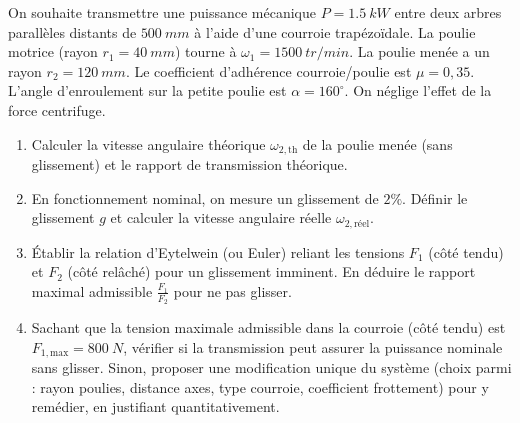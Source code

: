 \documentclass[11pt]{article}
\begin{document}
\begin{exercice}
On souhaite transmettre une puissance mécanique $P = \SI{1.5}{kW}$ entre deux arbres parallèles distants de $\SI{500}{mm}$ à l'aide d'une courroie trapézoïdale. La poulie motrice (rayon $r_1 = \SI{40}{mm}$) tourne à $\omega_1 = \SI{1500}{tr/min}$. La poulie menée a un rayon $r_2 = \SI{120}{mm}$. Le coefficient d'adhérence courroie/poulie est $\mu = 0,35$. L'angle d'enroulement sur la petite poulie est $\alpha = 160^\circ$. On néglige l'effet de la force centrifuge.

\begin{enumerate}
    \item Calculer la vitesse angulaire théorique $\omega_{2,\text{th}}$ de la poulie menée (sans glissement) et le rapport de transmission théorique.
    \item En fonctionnement nominal, on mesure un glissement de $2\%$. Définir le glissement $g$ et calculer la vitesse angulaire réelle $\omega_{2,\text{réel}}$.
    \item Établir la relation d'Eytelwein (ou Euler) reliant les tensions $F_1$ (côté tendu) et $F_2$ (côté relâché) pour un glissement imminent. En déduire le rapport maximal admissible $\frac{F_1}{F_2}$ pour ne pas glisser.
    \item Sachant que la tension maximale admissible dans la courroie (côté tendu) est $F_{1,\text{max}} = \SI{800}{N}$, vérifier si la transmission peut assurer la puissance nominale sans glisser. Sinon, proposer une modification unique du système (choix parmi : rayon poulies, distance axes, type courroie, coefficient frottement) pour y remédier, en justifiant quantitativement.
\end{enumerate}
\end{exercice}
\end{document}
